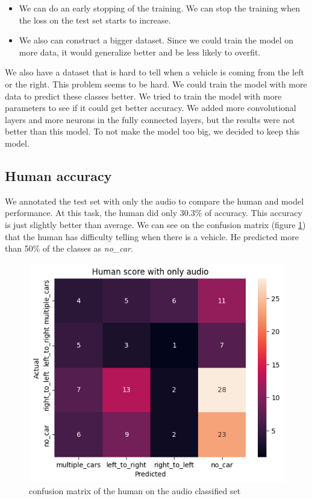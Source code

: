 \begin{itemize}
    \item We can do an early stopping of the training. We can stop the training when the loss on the test set starts to increase. 
    \item We also can construct a bigger dataset. Since we could train the model on more data, it would generalize better and be less likely to overfit.
\end{itemize}

We also have a dataset that is hard to tell when a vehicle is coming from the left or the right. This problem seems to be hard. We could train the model with more data to predict these classes better. We tried to train the model with more parameters to see if it could get better accuracy. We added more convolutional layers and more neurons in the fully connected layers, but the results were not better than this model. To not make the model too big, we decided to keep this model.

\subsection{Human accuracy}

We annotated the test set with only the audio to compare the human and model performance. At this task, the human did only 30.3\% of accuracy. This accuracy is just slightly better than average. We can see on the confusion matrix (figure \ref{fig:human_score_only_audio}) that the human has difficulty telling when there is a vehicle. He predicted more than 50\% of the classes as \textit{no\_car}. 

\begin{figure}[H]
    \centering
    \includegraphics[width=1\textwidth]{images/human_score_only_audio.png}
    \caption{confusion matrix of the human on the audio classified set}
    \label{fig:human_score_only_audio}
\end{figure}

